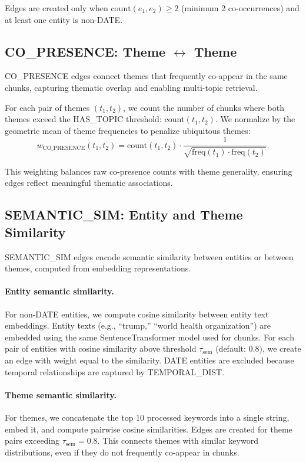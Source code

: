 \documentclass[10pt]{article}
\begin{document}
Edges are created only when $\text{count}(e_1, e_2) \ge 2$ (minimum 2 co-occurrences) and at least one entity is non-DATE.

\subsection{CO\_PRESENCE: Theme $\leftrightarrow$ Theme}

CO\_PRESENCE edges connect themes that frequently co-appear in the same chunks, capturing thematic overlap and enabling multi-topic retrieval.

For each pair of themes $(t_1, t_2)$, we count the number of chunks where both themes exceed the HAS\_TOPIC threshold: $\text{count}(t_1, t_2)$. We normalize by the geometric mean of theme frequencies to penalize ubiquitous themes:
\[
w_{\text{CO\_PRESENCE}}(t_1, t_2) = \text{count}(t_1, t_2) \cdot \frac{1}{\sqrt{\text{freq}(t_1) \cdot \text{freq}(t_2)}}.
\]

This weighting balances raw co-presence counts with theme generality, ensuring edges reflect meaningful thematic associations.

\subsection{SEMANTIC\_SIM: Entity and Theme Similarity}

SEMANTIC\_SIM edges encode semantic similarity between entities or between themes, computed from embedding representations.

\paragraph{Entity semantic similarity.} For non-DATE entities, we compute cosine similarity between entity text embeddings. Entity texts (e.g., ``trump,'' ``world health organization'') are embedded using the same SentenceTransformer model used for chunks. For each pair of entities with cosine similarity above threshold $\tau_{\text{sem}}$ (default: $0.8$), we create an edge with weight equal to the similarity. DATE entities are excluded because temporal relationships are captured by TEMPORAL\_DIST.

\paragraph{Theme semantic similarity.} For themes, we concatenate the top 10 processed keywords into a single string, embed it, and compute pairwise cosine similarities. Edges are created for theme pairs exceeding $\tau_{\text{sem}} = 0.8$. This connects themes with similar keyword distributions, even if they do not frequently co-appear in chunks.
\end{document}
